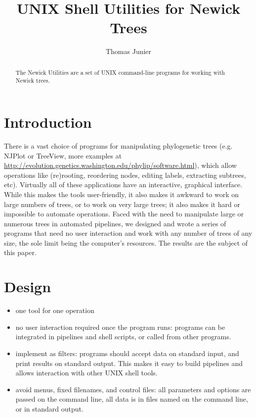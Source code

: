 \documentclass[a4paper,10pt]{article}
\title{UNIX Shell Utilities for Newick Trees}
\author{Thomas Junier}
\begin{document}
\maketitle

\begin{abstract}
The Newick Utilities are a set of UNIX command-line programs for working with
Newick trees.
\end{abstract}
\section{Introduction}

There is a vast choice of programs for manipulating phylogenetic trees (e.g.
NJPlot \cite{Raton2008} or TreeView, more examples at \url{
http://evolution.genetics.washington.edu/phylip/software.html}), which allow
operations like (re)rooting, reordering nodes, editing labels, extracting
subtrees, etc). Virtually all of these applications have an interactive,
graphical interface. While this makes the tools user-friendly, it also makes it
awkward to work on large numbers of trees, or to work on very large trees; it
also makes it hard or impossible to automate operations. Faced with the need to
manipulate large or numerous trees in automated pipelines, we designed and wrote
a series of programs that need no user interaction and work with any number of
trees of any size, the sole limit being the computer's resources. The results
are the subject of this paper.

\section{Design}

\begin{itemize}
 \item one tool for one operation
 \item no user interaction required once the program runs: programs can be
 integrated in pipelines and shell scripts, or called from other programs.
 \item implement as filters: programs should accept data on standard input, and print results on standard output. This makes it easy to build pipelines and allows interaction with other UNIX shell tools.
 \item avoid menus, fixed filenames, and control files: all parameters and options are passed on the command line, all data is in files named on the command line, or in standard output.
\end{itemize}
\end{document}
